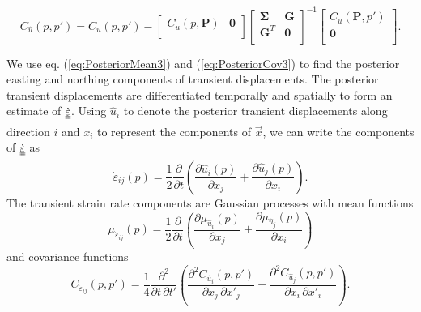 \documentclass[10pt,letter]{article}
\newcommand*{\du}[1]{\uuline{#1}}
\begin{document}
\begin{equation}\label{eq:PosteriorCov3}
C_{\hat{u}}(p,p') = C_u(p,p') - 
                    \left[\begin{array}{cc}
                          C_u(p,\bm{P}) & \bm{0} \\
                          \end{array}\right]
                    \left[\begin{array}{cc}
                          \bm{\Sigma} & \bm{G} \\
                          \bm{G}^T  & \bm{0} \\
                          \end{array}\right]^{-1}
                    \left[\begin{array}{c}
                          C_u(\bm{P},p') \\
                          \bm{0} \\
                          \end{array}\right].
\end{equation}

We use eq. (\ref{eq:PosteriorMean3}) and (\ref{eq:PosteriorCov3}) to find the posterior easting and northing components of transient displacements. The posterior transient displacements are differentiated temporally and spatially to form an estimate of $\dot{\du{\varepsilon}}$. Using $\hat{u}_i$ to denote the posterior transient displacements along direction $i$ and $x_i$ to represent the components of $\vec{x}$, we can write the components of $\dot{\du{\varepsilon}}$ as 
\begin{equation}\label{eq:StrainRate}
\dot{\varepsilon}_{ij}(p) = \frac{1}{2} \frac{\partial}{\partial t} \left(
                                        \frac{\partial \hat{u}_i(p)}{\partial x_j} +  
                                        \frac{\partial \hat{u}_j(p)}{\partial x_i}\right).
\end{equation}
The transient strain rate components are Gaussian processes with mean functions
\begin{equation}\label{eq:StrainMean}
\mu_{\dot{\varepsilon}_{ij}}(p) = \frac{1}{2}\frac{\partial}{\partial t}\left(
                                  \frac{\partial \mu_{\hat{u}_i}(p)}{\partial x_j} + 
                                  \frac{\partial \mu_{\hat{u}_j}(p)}{\partial x_i} \right)
\end{equation} 
and covariance functions
\begin{equation}\label{eq:StrainCov}
C_{\dot{\varepsilon}_{ij}}(p,p') = \frac{1}{4} \frac{\partial^2}{\partial t \, \partial t'}\left(
                                   \frac{\partial^2 C_{\hat{u}_i}(p,p')}{\partial x_j \, \partial x'_j} + 
                                   \frac{\partial^2 C_{\hat{u}_j}(p,p')}{\partial x_i \, \partial x'_i} \right).
\end{equation} 
\end{document}
